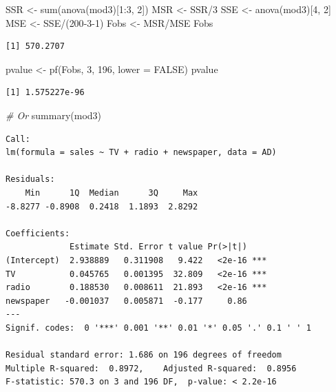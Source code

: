 \documentclass[
]{article}
\newenvironment{Shaded}{\begin{snugshade}}{\end{snugshade}}
\newcommand{\AttributeTok}[1]{\textcolor[rgb]{0.77,0.63,0.00}{#1}}
\newcommand{\CommentTok}[1]{\textcolor[rgb]{0.56,0.35,0.01}{\textit{#1}}}
\newcommand{\ConstantTok}[1]{\textcolor[rgb]{0.00,0.00,0.00}{#1}}
\newcommand{\DecValTok}[1]{\textcolor[rgb]{0.00,0.00,0.81}{#1}}
\newcommand{\FunctionTok}[1]{\textcolor[rgb]{0.00,0.00,0.00}{#1}}
\newcommand{\NormalTok}[1]{#1}
\newcommand{\OtherTok}[1]{\textcolor[rgb]{0.56,0.35,0.01}{#1}}
\newcommand{\SpecialCharTok}[1]{\textcolor[rgb]{0.00,0.00,0.00}{#1}}
\begin{document}
\begin{Shaded}
\begin{Highlighting}[]
\NormalTok{SSR }\OtherTok{\textless{}{-}} \FunctionTok{sum}\NormalTok{(}\FunctionTok{anova}\NormalTok{(mod3)[}\DecValTok{1}\SpecialCharTok{:}\DecValTok{3}\NormalTok{, }\DecValTok{2}\NormalTok{])}
\NormalTok{MSR }\OtherTok{\textless{}{-}}\NormalTok{ SSR}\SpecialCharTok{/}\DecValTok{3}
\NormalTok{SSE }\OtherTok{\textless{}{-}} \FunctionTok{anova}\NormalTok{(mod3)[}\DecValTok{4}\NormalTok{, }\DecValTok{2}\NormalTok{]}
\NormalTok{MSE }\OtherTok{\textless{}{-}}\NormalTok{ SSE}\SpecialCharTok{/}\NormalTok{(}\DecValTok{200{-}3{-}1}\NormalTok{)}
\NormalTok{Fobs }\OtherTok{\textless{}{-}}\NormalTok{ MSR}\SpecialCharTok{/}\NormalTok{MSE}
\NormalTok{Fobs}
\end{Highlighting}
\end{Shaded}

\begin{verbatim}
[1] 570.2707
\end{verbatim}

\begin{Shaded}
\begin{Highlighting}[]
\NormalTok{pvalue }\OtherTok{\textless{}{-}} \FunctionTok{pf}\NormalTok{(Fobs, }\DecValTok{3}\NormalTok{, }\DecValTok{196}\NormalTok{, }\AttributeTok{lower =} \ConstantTok{FALSE}\NormalTok{)}
\NormalTok{pvalue}
\end{Highlighting}
\end{Shaded}

\begin{verbatim}
[1] 1.575227e-96
\end{verbatim}

\begin{Shaded}
\begin{Highlighting}[]
\CommentTok{\# Or}
\FunctionTok{summary}\NormalTok{(mod3)}
\end{Highlighting}
\end{Shaded}

\begin{verbatim}
Call:
lm(formula = sales ~ TV + radio + newspaper, data = AD)

Residuals:
    Min      1Q  Median      3Q     Max 
-8.8277 -0.8908  0.2418  1.1893  2.8292 

Coefficients:
             Estimate Std. Error t value Pr(>|t|)    
(Intercept)  2.938889   0.311908   9.422   <2e-16 ***
TV           0.045765   0.001395  32.809   <2e-16 ***
radio        0.188530   0.008611  21.893   <2e-16 ***
newspaper   -0.001037   0.005871  -0.177     0.86    
---
Signif. codes:  0 '***' 0.001 '**' 0.01 '*' 0.05 '.' 0.1 ' ' 1

Residual standard error: 1.686 on 196 degrees of freedom
Multiple R-squared:  0.8972,    Adjusted R-squared:  0.8956 
F-statistic: 570.3 on 3 and 196 DF,  p-value: < 2.2e-16
\end{verbatim}
\end{document}
